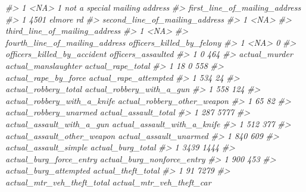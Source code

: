 \documentclass[
]{krantz}
\makeatletter
\newenvironment{Shaded}{\begin{snugshade}}{\end{snugshade}}
\newcommand{\CommentTok}[1]{\textcolor[rgb]{0.37,0.37,0.37}{\textit{#1}}}
\newenvironment{kframe}{%
\medskip{}
\setlength{\fboxsep}{.8em}
 \def\at@end@of@kframe{}%
 \ifinner\ifhmode%
  \def\at@end@of@kframe{\end{minipage}}%
  \begin{minipage}{\columnwidth}%
 \fi\fi%
 \def\FrameCommand##1{\hskip\@totalleftmargin \hskip-\fboxsep
 \colorbox{shadecolor}{##1}\hskip-\fboxsep
     \hskip-\linewidth \hskip-\@totalleftmargin \hskip\columnwidth}%
 \MakeFramed {\advance\hsize-\width
   \@totalleftmargin\z@ \linewidth\hsize
   \@setminipage}}%
 {\par\unskip\endMakeFramed%
 \at@end@of@kframe}
\renewenvironment{Shaded}{\begin{kframe}}{\end{kframe}}
\makeatother
\begin{document}
\begin{Shaded}
\begin{Highlighting}[]
\CommentTok{\#\textgreater{} 1           \textless{}NA\textgreater{}            1 not a special mailing address}
\CommentTok{\#\textgreater{}   first\_line\_of\_mailing\_address}
\CommentTok{\#\textgreater{} 1                4501 elmore rd}
\CommentTok{\#\textgreater{}   second\_line\_of\_mailing\_address}
\CommentTok{\#\textgreater{} 1                           \textless{}NA\textgreater{}}
\CommentTok{\#\textgreater{}   third\_line\_of\_mailing\_address}
\CommentTok{\#\textgreater{} 1                          \textless{}NA\textgreater{}}
\CommentTok{\#\textgreater{}   fourth\_line\_of\_mailing\_address officers\_killed\_by\_felony}
\CommentTok{\#\textgreater{} 1                           \textless{}NA\textgreater{}                         0}
\CommentTok{\#\textgreater{}   officers\_killed\_by\_accident officers\_assaulted}
\CommentTok{\#\textgreater{} 1                           0                464}
\CommentTok{\#\textgreater{}   actual\_murder actual\_manslaughter actual\_rape\_total}
\CommentTok{\#\textgreater{} 1            18                   0               558}
\CommentTok{\#\textgreater{}   actual\_rape\_by\_force actual\_rape\_attempted}
\CommentTok{\#\textgreater{} 1                  534                    24}
\CommentTok{\#\textgreater{}   actual\_robbery\_total actual\_robbery\_with\_a\_gun}
\CommentTok{\#\textgreater{} 1                  558                       124}
\CommentTok{\#\textgreater{}   actual\_robbery\_with\_a\_knife actual\_robbery\_other\_weapon}
\CommentTok{\#\textgreater{} 1                          65                          82}
\CommentTok{\#\textgreater{}   actual\_robbery\_unarmed actual\_assault\_total}
\CommentTok{\#\textgreater{} 1                    287                 5777}
\CommentTok{\#\textgreater{}   actual\_assault\_with\_a\_gun actual\_assault\_with\_a\_knife}
\CommentTok{\#\textgreater{} 1                       512                         377}
\CommentTok{\#\textgreater{}   actual\_assault\_other\_weapon actual\_assault\_unarmed}
\CommentTok{\#\textgreater{} 1                         840                    609}
\CommentTok{\#\textgreater{}   actual\_assault\_simple actual\_burg\_total}
\CommentTok{\#\textgreater{} 1                  3439              1444}
\CommentTok{\#\textgreater{}   actual\_burg\_force\_entry actual\_burg\_nonforce\_entry}
\CommentTok{\#\textgreater{} 1                     900                        453}
\CommentTok{\#\textgreater{}   actual\_burg\_attempted actual\_theft\_total}
\CommentTok{\#\textgreater{} 1                    91               7279}
\CommentTok{\#\textgreater{}   actual\_mtr\_veh\_theft\_total actual\_mtr\_veh\_theft\_car}

\end{Highlighting}
\end{Shaded}
\end{document}
